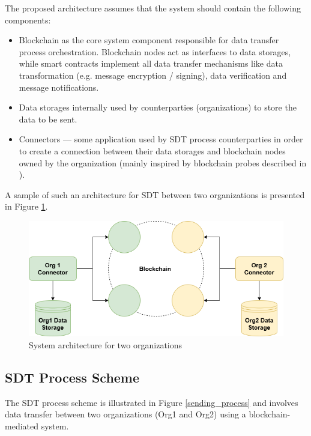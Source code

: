 \documentclass[10pt]{llncs}
\begin{document}
The proposed architecture assumes that the system should contain the following components:

\begin{itemize}
    \item Blockchain as the core system component responsible for data transfer process orchestration. 
    Blockchain nodes act as interfaces to data storages, while smart contracts implement all data transfer mechanisms like
    data transformation (e.g. message encryption / signing), data verification and message notifications. 
    \item Data storages internally used by counterparties (organizations) to store the data to be sent.
    \item Connectors --- some application used by SDT process counterparties in order to create a connection between their data storages
    and blockchain nodes owned by the organization (mainly inspired by blockchain probes described in \cite{Jia2023}).
\end{itemize}

A sample of such an architecture for SDT between two organizations is presented in Figure \ref{system_architecture}.

\begin{figure}[ht!]
    \includegraphics[width=\textwidth]{system_architecture.png}
    \caption{System architecture for two organizations} \label{system_architecture}
\end{figure}

\subsection{SDT Process Scheme}

The SDT process scheme is illustrated in Figure \ref{sending_process} and involves data transfer between two organizations (Org1 and Org2) using a blockchain-mediated system. 
\end{document}
